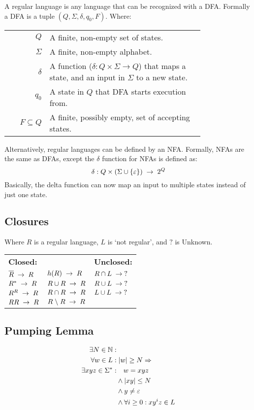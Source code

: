 A regular language is any language that can be recognized with a DFA.
Formally a DFA is a tuple $(Q,\Sigma,\delta,q_0,F)$. Where:

\begin{tabular}{rp{0.79\linewidth}}
$Q$             & A finite, non-empty set of states. \\
$\Sigma$        & A finite, non-empty alphabet. \\
$\delta$        & A function ($\delta : Q \times \Sigma \to Q$) that maps
                  a state, and an input in $\Sigma$ to a new state. \\
$q_0$           & A state in $Q$ that DFA starts execution from. \\
$F \subseteq Q$ & A finite, possibly empty, set of accepting states.
\end{tabular}
Alternatively, regular languages can be defined by an NFA. Formally, NFAs are
the same as DFAs, except the $\delta$ function for NFAs is defined as:
\[
    \delta : Q \times (\Sigma \cup \{\varepsilon\}) \;\to\; 2^Q
\]
Basically, the delta function can
now map an input to multiple states instead of just one state.

\subsection{Closures}
Where $R$ is a regular language, $L$ is `not regular', and $?$ is Unknown.

\settowidth{\templength}{$R \cap R \spto R$}
\addtolength{\templength}{1cm}
\begin{tabular}{lp{\templength}l}
\textbf{Closed:}       &                    & \textbf{Unclosed:} \\
$\overline{R} \;\to\; R$ & $h(R) \;\to\; R$     & $R \cap L \;\to\; ?$ \\
$R^* \;\to\; R$          & $R \cup R \;\to\; R$ & $R \cup L \;\to\; ?$\\
$R^R \;\to\; R$          & $R \cap R \spto R$ & $L \cup L \;\to\; ?$\\
$RR \;\to\; R$           & $R \;\backslash\; R \;\to\; R$ & \\
\end{tabular}

\subsection{Pumping Lemma}
\begin{align*}
\exists N \in \mathbb{N}: & \\
         \forall w \in L: &\; |w| \geq N \Rightarrow \\
\exists xyz \in \Sigma^*: & \quad w = xyz \\
                          & \land |xy| \leq N \\
                          & \land y \neq \varepsilon \\
                          & \land \forall i \geq 0: xy^iz \in L
\end{align*}
